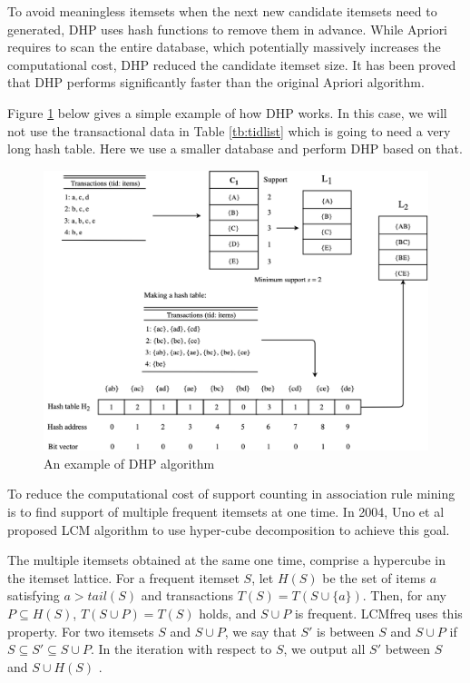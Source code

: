To avoid meaningless itemsets when the next new candidate itemsets need to generated, DHP uses hash functions to remove them in advance. While Apriori requires to scan the entire database, which potentially massively increases the computational cost, DHP reduced the candidate itemset size. It has been proved that DHP performs significantly faster than the original Apriori algorithm.

Figure \ref{fig:dhp} below gives a simple example of how DHP works. In this case, we will not use the transactional data in Table \ref{tb:tidlist} which is going to need a very long hash table. Here we use a smaller database and perform DHP based on that. 

\begin{figure}[H]
    \centering
    \includegraphics[width=1.0\textwidth]{RelatedWorks/DHP.png}
    \caption{An example of DHP algorithm \cite{DHP}}
    \label{fig:dhp}
\end{figure}

To reduce the computational cost of support counting in association rule mining is to find support of multiple frequent itemsets at one time. In 2004, Uno et al \cite{LCM} proposed LCM algorithm to use hyper-cube decomposition to achieve this goal. 

\begin{definition}
\label{LCM}
The multiple itemsets obtained at the same one time, comprise a hypercube in the itemset lattice. For a frequent itemset $S$, let $H(S)$ be the set of items $a$ satisfying $a > tail(S)$ and transactions $T(S)=T(S\cup \{a\})$. Then, for any $P\subseteq H(S)$, $T(S\cup P)=T(S)$ holds, and $S\cup P$ is frequent. LCMfreq \cite{LCM} uses this property. For two itemsets $S$ and $S\cup P$, we say that $S'$ is between $S$ and $S\cup P$ if $S \subseteq S' \subseteq S \cup P$. In the iteration with respect to $S$, we output all $S'$ between $S$ and $S \cup H(S)$ \cite{LCM}.
\end{definition}

